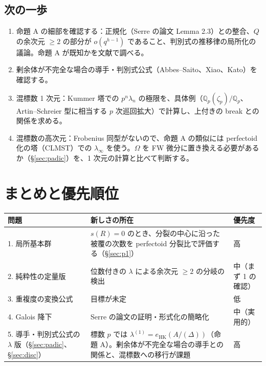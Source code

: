 \documentclass[11pt,a4paper]{ltjsarticle}
\theoremstyle{plain}
\theoremstyle{definition}
\theoremstyle{remark}
\theoremstyle{plain}
\newcommand{\eHK}{e_{\mathrm{HK}}}
\begin{document}
\subsection{次の一歩}
\begin{enumerate}
  \item 命題 A の細部を確認する：正規化（Serre の論文 Lemma 2.3）との整合、$Q$ の余次元 $\ge2$ の部分が $o(q^{h-1})$ であること、判別式の推移律の局所化の議論。命題 A が既知かを文献で調べる。
  \item 剰余体が不完全な場合の導手・判別式公式（Abbes--Saito、Xiao、Kato）を確認する。
  \item 混標数 1 次元：Kummer 塔での $p^n\lambda_n$ の極限を、具体例（$\mathbb{Q}_p(\zeta_p)/\mathbb{Q}_p$、Artin--Schreier 型に相当する $p$ 次巡回拡大）で計算し、上付きの break との関係を求める。
  \item 混標数の高次元：Frobenius 同型がないので、命題 A の類似には perfectoid 化の塔（CLMST）での $\lambda_\infty$ を使う。$\Omega$ を FW 微分に置き換える必要があるか（\S\ref{sec:padic}）を、1 次元の計算と比べて判断する。
\end{enumerate}

\section{まとめと優先順位}

\begin{center}
\small
\begin{tabularx}{\textwidth}{>{\raggedright}p{3.2cm}>{\raggedright}X>{\raggedright\arraybackslash}p{2.4cm}}
\toprule
問題 & 新しさの所在 & 優先度 \\
\midrule
1. 局所基本群 & $s(R) = 0$ のとき、分裂の中心に沿った被覆の次数を perfectoid 分裂比で評価する（\S\ref{sec:p1}） & 高 \\
2. 純粋性の定量版 & 位数付きの $\lambda$ による余次元 $\ge2$ の分岐の検出 & 中（まず 1 の確認） \\
3. 重複度の変換公式 & 目標が未定 & 低 \\
4. Galois 降下 & Serre の論文の証明・形式化の簡略化 & 中（実用的） \\
5. 導手・判別式公式の $\lambda$ 版（\S\ref{sec:padic}、\S\ref{sec:disc}） & 標数 $p$ では $\lambda^{(1)} = \eHK(A/(\Delta))$（命題 A）。剰余体が不完全な場合の導手との関係と、混標数への移行が課題 & 高 \\
\bottomrule
\end{tabularx}
\end{center}
\end{document}
